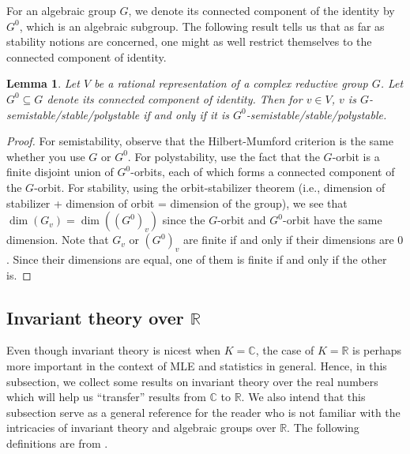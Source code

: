 \documentclass[11pt]{amsart}
\newtheorem{lemma}[theorem]{Lemma}
\theoremstyle{definition}
\newcommand{\R}{{\mathbb R}}
\newcommand{\C}{{\mathbb C}}
\begin{document}
For an algebraic group $G$, we denote its connected component of the identity by $G^0$, which is an algebraic subgroup. The following result tells us that as far as stability notions are concerned, one might as well restrict themselves to the connected component of identity. 

\begin{lemma} \label{lem.get.rid.fin}
Let $V$ be a rational representation of a complex reductive group $G$. Let $G^0 \subseteq G$ denote its connected component of identity. Then for $v \in V$, $v$ is $G$-semistable/stable/polystable if and only if it is $G^0$-semistable/stable/polystable.
\end{lemma}

\begin{proof}
For semistability, observe that the Hilbert-Mumford criterion is the same whether you use $G$ or $G^0$. For polystability, use the fact that the $G$-orbit is a finite disjoint union of $G^0$-orbits, each of which forms a connected component of the $G$-orbit. For stability, using the orbit-stabilizer theorem (i.e., dimension of stabilizer + dimension of orbit = dimension of the group), we see that $\dim(G_v) = \dim((G^0)_v)$ since the $G$-orbit and $G^0$-orbit have the same dimension. Note that $G_v$ or $(G^0)_v$ are finite if and only if their dimensions are $0$. Since their dimensions are equal, one of them is finite if and only if the other is. 
\end{proof}















\subsection{Invariant theory over $\R$}
Even though invariant theory is nicest when $K = \C$, the case of $K = \R$ is perhaps more important in the context of MLE and statistics in general. Hence, in this subsection, we collect some results on invariant theory over the real numbers which will help us ``transfer'' results from $\C$ to $\R$. We also intend that this subsection serve as a general reference for the reader who is not familiar with the intricacies of invariant theory and algebraic groups over $\R$. The following definitions are from \cite{Borel-linalg}.
\end{document}
